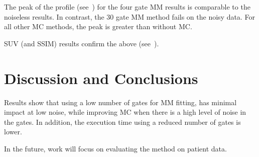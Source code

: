     The peak of the profile (see~) for the four gate \gls{MM} results is comparable to the noiseless results. In contrast, the $30$ gate \gls{MM} method fails on the noisy data. For all other \gls{MC} methods, the peak is greater than without \gls{MC}.
     
    \acrshort{SUV} (and \acrshort{SSIM}) results confirm the above (see~).


\section{Discussion and Conclusions} \label{sec:discussion_and_conclusions}
    Results show that using a low number of gates for \gls{MM} fitting, has minimal impact at low noise, while improving \gls{MC} when there is a high level of noise in the gates. In addition, the execution time using a reduced number of gates is lower.
    
    In the future, work will focus on evaluating the method on patient data.
    